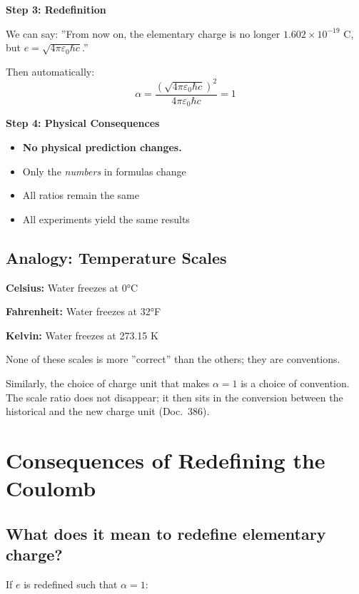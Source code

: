 	\textbf{Step 3: Redefinition}
	
	We can say: ''From now on, the elementary charge is no longer $1.602 \times 10^{-19}$ C, but $e = \sqrt{4\pi\varepsilon_0\hbar c}$.''
	
	Then automatically:
	\begin{equation}
		\alpha = \frac{(\sqrt{4\pi\varepsilon_0\hbar c})^2}{4\pi\varepsilon_0\hbar c} = 1
	\end{equation}
	
	\textbf{Step 4: Physical Consequences}
	
	\begin{itemize}
		\item \textbf{No physical prediction changes.}
		\item Only the \textit{numbers} in formulas change
		\item All ratios remain the same
		\item All experiments yield the same results
	\end{itemize}
	
	\subsection{Analogy: Temperature Scales}
	
	\textbf{Celsius:} Water freezes at 0°C
	
	\textbf{Fahrenheit:} Water freezes at 32°F
	
	\textbf{Kelvin:} Water freezes at 273.15 K
	
	None of these scales is more ''correct'' than the others; they are conventions.
	
	Similarly, the choice of charge unit that makes $\alpha = 1$ is a choice of convention. The scale ratio does not disappear; it then sits in the conversion between the historical and the new charge unit (Doc.~386).
	
	\section{Consequences of Redefining the Coulomb}
	
	\subsection{What does it mean to redefine elementary charge?}
	
	If $e$ is redefined such that $\alpha = 1$:
	
